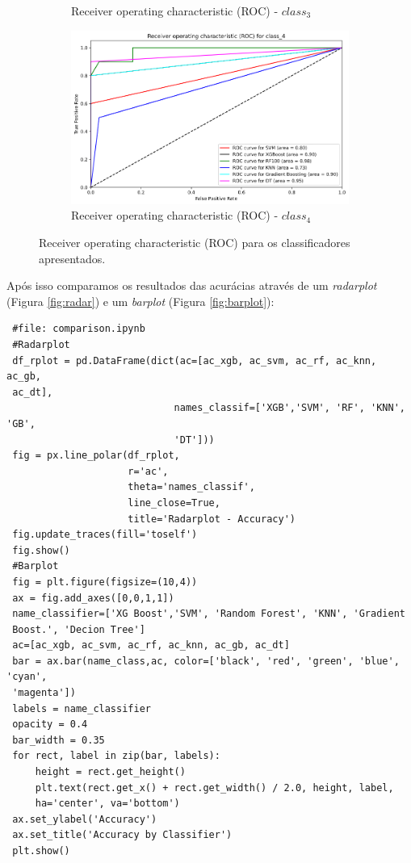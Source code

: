 \documentclass[
	article,			%
	11pt,				%
	oneside,			%
	a4paper,			%
	english,			%
	brazil,				%
	sumario=tradicional
	]{abntex2}
\begin{document}
\begin{figure}[H]
\begin{subfigure}[b]{0.475\textwidth}
    \caption{Receiver operating characteristic (ROC) - $class_3$}
    \label{fig:roc3}
    \end{subfigure}
    \hfill
    \begin{subfigure}[b]{0.475\textwidth}
    \centering
    \includegraphics[scale=0.25]{fig/roc4.png}
    \caption{Receiver operating characteristic (ROC) - $class_4$}
    \label{fig:roc4}
    \end{subfigure}
    \caption{Receiver operating characteristic (ROC) para os classificadores apresentados.}
    \label{roc}
\end{figure}

Após isso comparamos os resultados das acurácias através de um \textit{radarplot} (Figura \ref{fig:radar}) e um \textit{barplot} (Figura \ref{fig:barplot}):

\begin{verbatim}
 #file: comparison.ipynb
 #Radarplot
 df_rplot = pd.DataFrame(dict(ac=[ac_xgb, ac_svm, ac_rf, ac_knn, ac_gb,
 ac_dt],
                             names_classif=['XGB','SVM', 'RF', 'KNN', 'GB',
                             'DT']))
 fig = px.line_polar(df_rplot, 
                     r='ac', 
                     theta='names_classif', 
                     line_close=True, 
                     title='Radarplot - Accuracy')
 fig.update_traces(fill='toself')
 fig.show()
 #Barplot
 fig = plt.figure(figsize=(10,4))
 ax = fig.add_axes([0,0,1,1])
 name_classifier=['XG Boost','SVM', 'Random Forest', 'KNN', 'Gradient
 Boost.', 'Decion Tree']
 ac=[ac_xgb, ac_svm, ac_rf, ac_knn, ac_gb, ac_dt]
 bar = ax.bar(name_class,ac, color=['black', 'red', 'green', 'blue', 'cyan',
 'magenta'])
 labels = name_classifier
 opacity = 0.4
 bar_width = 0.35
 for rect, label in zip(bar, labels):
     height = rect.get_height()
     plt.text(rect.get_x() + rect.get_width() / 2.0, height, label,
     ha='center', va='bottom')
 ax.set_ylabel('Accuracy')
 ax.set_title('Accuracy by Classifier')
 plt.show()
\end{verbatim}
\end{document}
